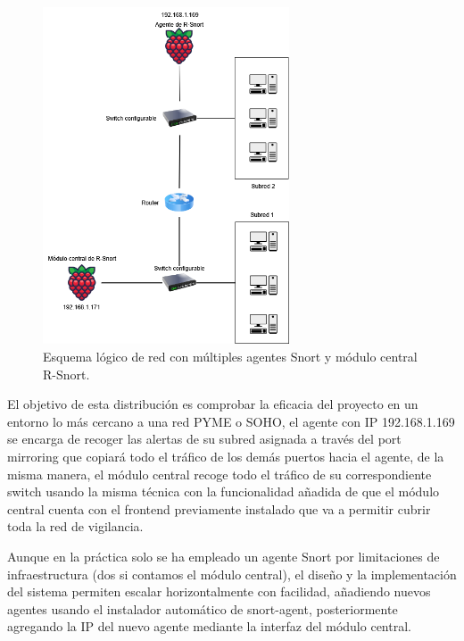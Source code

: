 \documentclass[11pt,a4paper,twoside]{report}
\begin{document}
\begin{figure}[H]
	\centering
	\includegraphics[width=0.65\textwidth]{documento/esquema_red.png}
	\caption{Esquema lógico de red con múltiples agentes Snort y módulo central R-Snort.}
	\label{fig:esquema-red}
\end{figure}

\newpage

El objetivo de esta distribución es comprobar la eficacia del proyecto en un entorno lo más cercano a una red PYME o SOHO, el agente con IP 192.168.1.169 se encarga de recoger las alertas de su subred asignada a través del port mirroring que copiará todo el tráfico de los demás puertos hacia el agente, de la misma manera, el módulo central recoge todo el tráfico de su correspondiente switch usando la misma técnica con la funcionalidad añadida de que el módulo central cuenta con el frontend previamente instalado que va a permitir cubrir toda la red de vigilancia.\newline

Aunque en la práctica solo se ha empleado un agente Snort por limitaciones de infraestructura (dos si contamos el módulo central), el diseño y la implementación del sistema permiten escalar horizontalmente con facilidad, añadiendo nuevos agentes usando el instalador automático de snort-agent, posteriormente agregando la IP del nuevo agente mediante la interfaz del módulo central.\newline
\end{document}
